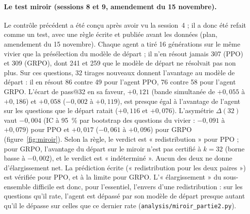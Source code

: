 \documentclass[11pt,a4paper]{article}
\begin{document}
\paragraph{Le test miroir (sessions 8 et 9, amendement du 15 novembre).} Le contrôle précédent a été conçu après avoir vu la session~4 ; il a donc été refait comme un test, avec une règle écrite et publiée avant les données (plan, amendement du 15 novembre). Chaque agent a tiré 16 générations sur le même vivier que la présélection du modèle de départ ; il n'en résout jamais 307 (PPO) et 309 (GRPO), dont 241 et 259 que le modèle de départ ne résolvait pas non plus. Sur ces questions, 32 tirages nouveaux donnent l'avantage au modèle de départ : il en résout 86 contre 49 pour l'agent PPO, 76 contre 58 pour l'agent GRPO. L'écart de pass@32 en sa faveur, $+0{,}121$ (bande simultanée de $+0{,}055$ à $+0{,}186$) et $+0{,}058$ ($-0{,}002$ à $+0{,}119$), est presque égal à l'avantage de l'agent sur les questions que le départ ratait ($+0{,}116$ et $+0{,}076$). L'asymétrie $\Delta(32)$ vaut $-0{,}004$ (IC à 95~\% par bootstrap des questions du vivier : $-0{,}091$ à $+0{,}079$) pour PPO et $+0{,}017$ ($-0{,}061$ à $+0{,}096$) pour GRPO (figure~\ref{fig:miroir}). Selon la règle, le verdict est « redistribution » pour PPO ; pour GRPO, l'avantage du départ sur le miroir n'est pas certifié à $k = 32$ (borne basse à $-0{,}002$), et le verdict est « indéterminé ». Aucun des deux ne donne d'élargissement net. La prédiction écrite (« redistribution pour les deux paires ») est vérifiée pour PPO, et à la limite pour GRPO. L'« élargissement » du sous-ensemble difficile est donc, pour l'essentiel, l'envers d'une redistribution : sur les questions qu'il rate, l'agent est dépassé par son modèle de départ presque autant qu'il le dépasse sur celles que ce dernier rate (\texttt{analysis/miroir\_partie2.py}).
\end{document}
